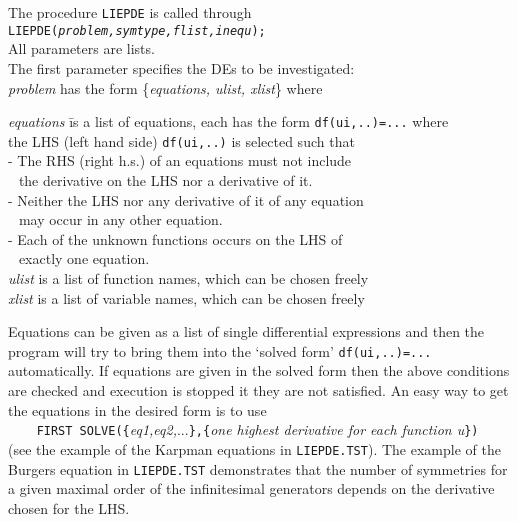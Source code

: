 The procedure {\tt LIEPDE} is called through \\
{\tt LIEPDE({\it problem,symtype,flist,inequ}); } \\
All parameters are lists.  \\[6pt]
The first parameter specifies the DEs to be investigated: \\
{\it problem} has the form \{{\it equations, ulist, xlist}\} where
\begin{tabbing}
\hspace{0.5cm}
 {\it equations } \=  is a list of equations,
              each has the form {\tt df(ui,..)=...} where \\
       \> the LHS (left hand side) {\tt df(ui,..)} is selected such that \\
       \>  - The RHS (right h.s.) of an equations must not include     \\
       \>$\;\,$ the derivative on the LHS nor a derivative of it.  \\
       \>  - Neither the LHS nor any derivative of it of any equation \\
       \>$\;\,$ may occur in any other equation.\\
       \>  - Each of the unknown functions occurs on the LHS of \\
       \>$\;\,$ exactly one equation.  \\
\hspace{0.5cm}
 {\it ulist} \>  is a list of function names, which can be chosen freely \\
\hspace{0.5cm}
 {\it xlist}  \>  is a list of variable names, which can be chosen freely 
\end{tabbing}
Equations can be given as a list of single differential expressions and then
the program will try to bring them into the `solved form' {\tt df(ui,..)=...}
automatically. If equations are given in the solved form then the above
conditions are checked and execution is stopped it they are not satisfied.
An easy way to get the equations in the desired form is to use \\
\verb+    FIRST SOLVE({+{\it eq1,eq2,}...\verb+},{+{\it one highest
derivative for each function u}\verb+})+  \\
(see the example of the Karpman equations in {\tt LIEPDE.TST}). 
The example of the Burgers equation in {\tt LIEPDE.TST} demonstrates 
that the number of symmetries for a given maximal order of the infinitesimal
generators depends on the derivative chosen for the LHS.

